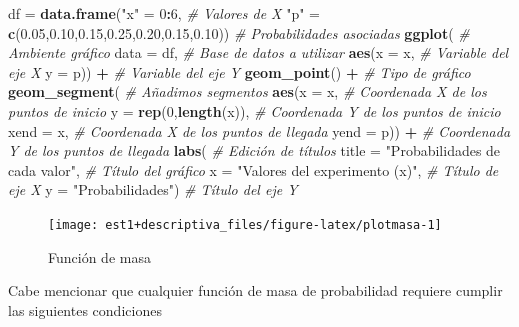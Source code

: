\documentclass[
  11pt,
]{book}
\newenvironment{Shaded}{\begin{snugshade}}{\end{snugshade}}
\newcommand{\AttributeTok}[1]{\textcolor[rgb]{0.13,0.29,0.53}{#1}}
\newcommand{\CommentTok}[1]{\textcolor[rgb]{0.56,0.35,0.01}{\textit{#1}}}
\newcommand{\DecValTok}[1]{\textcolor[rgb]{0.00,0.00,0.81}{#1}}
\newcommand{\FloatTok}[1]{\textcolor[rgb]{0.00,0.00,0.81}{#1}}
\newcommand{\FunctionTok}[1]{\textcolor[rgb]{0.13,0.29,0.53}{\textbf{#1}}}
\newcommand{\NormalTok}[1]{#1}
\newcommand{\OtherTok}[1]{\textcolor[rgb]{0.56,0.35,0.01}{#1}}
\newcommand{\SpecialCharTok}[1]{\textcolor[rgb]{0.81,0.36,0.00}{\textbf{#1}}}
\newcommand{\StringTok}[1]{\textcolor[rgb]{0.31,0.60,0.02}{#1}}
\theoremstyle{definition}
\theoremstyle{definition}
\theoremstyle{definition}
\theoremstyle{definition}
\theoremstyle{remark}
\begin{document}
\begin{Shaded}
\begin{Highlighting}[]
\NormalTok{df }\OtherTok{=} \FunctionTok{data.frame}\NormalTok{(}\StringTok{"x"} \OtherTok{=} \DecValTok{0}\SpecialCharTok{:}\DecValTok{6}\NormalTok{, }\CommentTok{\# Valores de X}
                \StringTok{"p"} \OtherTok{=} \FunctionTok{c}\NormalTok{(}\FloatTok{0.05}\NormalTok{,}\FloatTok{0.10}\NormalTok{,}\FloatTok{0.15}\NormalTok{,}\FloatTok{0.25}\NormalTok{,}\FloatTok{0.20}\NormalTok{,}\FloatTok{0.15}\NormalTok{,}\FloatTok{0.10}\NormalTok{)) }\CommentTok{\# Probabilidades asociadas}
\FunctionTok{ggplot}\NormalTok{( }\CommentTok{\# Ambiente gráfico}
  \AttributeTok{data =}\NormalTok{ df, }\CommentTok{\# Base de datos a utilizar}
  \FunctionTok{aes}\NormalTok{(}\AttributeTok{x =}\NormalTok{ x, }\CommentTok{\# Variable del eje X}
      \AttributeTok{y =}\NormalTok{ p)) }\SpecialCharTok{+} \CommentTok{\# Variable del eje Y}
  \FunctionTok{geom\_point}\NormalTok{() }\SpecialCharTok{+} \CommentTok{\# Tipo de gráfico}
  \FunctionTok{geom\_segment}\NormalTok{( }\CommentTok{\# Añadimos segmentos}
    \FunctionTok{aes}\NormalTok{(}\AttributeTok{x =}\NormalTok{ x, }\CommentTok{\# Coordenada X de los puntos de inicio}
        \AttributeTok{y =} \FunctionTok{rep}\NormalTok{(}\DecValTok{0}\NormalTok{,}\FunctionTok{length}\NormalTok{(x)), }\CommentTok{\# Coordenada Y de los puntos de inicio}
        \AttributeTok{xend =}\NormalTok{ x, }\CommentTok{\# Coordenada X de los puntos de llegada}
        \AttributeTok{yend =}\NormalTok{ p)) }\SpecialCharTok{+} \CommentTok{\# Coordenada Y de los puntos de llegada}
  \FunctionTok{labs}\NormalTok{( }\CommentTok{\# Edición de títulos}
    \AttributeTok{title =} \StringTok{"Probabilidades de cada valor"}\NormalTok{, }\CommentTok{\# Título del gráfico}
    \AttributeTok{x =} \StringTok{"Valores del experimento (x)"}\NormalTok{, }\CommentTok{\# Título de eje X}
    \AttributeTok{y =} \StringTok{"Probabilidades"}\NormalTok{) }\CommentTok{\# Título del eje Y}
\end{Highlighting}
\end{Shaded}

\begin{figure}

{\centering \texttt{[image: est1+descriptiva\_files/figure-latex/plotmasa-1]} 

}

\caption{Función de masa}\label{fig:plotmasa}
\end{figure}

Cabe mencionar que cualquier función de masa de probabilidad requiere cumplir las siguientes condiciones
\end{document}
